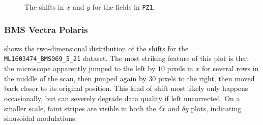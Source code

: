 \documentclass{article}
\begin{document}
\begin{figure}[ht]
\begin{subfigure}{0.49\linewidth}
		\caption{}
		\label{fig:2Dpolarisy}
	\end{subfigure}
	\caption{The shifts in  $x$ and  $y$ for the fields in \texttt{PZ1}.}
	\label{fig:2Dpolaris}
\end{figure}

\subsubsection{BMS Vectra Polaris}
\label{sec:2DBMS}

 shows the two-dimensional distribution of the shifts for the \texttt{ML1603474\_BMS069\_5\_21} dataset.  The most striking feature of this plot is that the microscope apparently jumped to the left by $10$ pixels in $x$ for several rows in the middle of the scan, then jumped again by $30$ pixels to the right, then moved back closer to its original position.  This kind of shift most likely only happens occasionally, but can severely degrade data quality if left uncorrected.  On a smaller scale, faint stripes are visible in both the $\delta x$ and $\delta y$ plots, indicating sinusoidal modulations.

\end{document}
